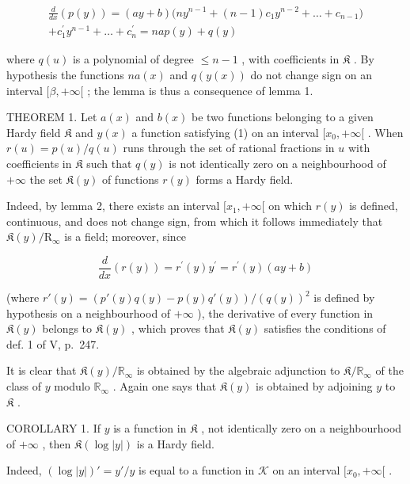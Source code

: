 \[
\begin{array}{c} \frac {d}{d x} (p (y)) = (a y + b) \bigl (n y ^ {n - 1} + (n - 1) c _ {1} y ^ {n - 2} + \dots + c _ {n - 1} \bigr) \\ + c _ {1} ^ {\prime} y ^ {n - 1} + \dots + c _ {n} ^ {\prime} = n a p (y) + q (y) \end{array}
\]

where \(q(u)\) is a polynomial of degree \(\leqslant n - 1\) , with coefficients in \(\mathfrak{K}\) . By hypothesis the functions \(na(x)\) and \(q(y(x))\) do not change sign on an interval \([\beta, +\infty[\) ; the lemma is thus a consequence of lemma 1.

THEOREM 1. Let \(a(x)\) and \(b(x)\) be two functions belonging to a given Hardy field \(\mathfrak{K}\) and \(y(x)\) a function satisfying (1) on an interval \([x_0, +\infty[\) . When \(r(u) = p(u) / q(u)\) runs through the set of rational fractions in \(u\) with coefficients in \(\mathfrak{K}\) such that \(q(y)\) is not identically zero on a neighbourhood of \(+\infty\) the set \(\mathfrak{K}(y)\) of functions \(r(y)\) forms a Hardy field.

Indeed, by lemma 2, there exists an interval \([x_1, +\infty[\) on which \(r(y)\) is defined, continuous, and does not change sign, from which it follows immediately that \(\mathfrak{K}(y)/\mathrm{R}_{\infty}\) is a field; moreover, since

\[
\frac {d}{d x} (r (y)) = r ^ {\prime} (y) y ^ {\prime} = r ^ {\prime} (y) (a y + b)
\]

(where \(r'(y) = \left(p'(y)q(y) - p(y)q'(y)\right)/\left(q(y)\right)^2\) is defined by hypothesis on a neighbourhood of \(+\infty\) ), the derivative of every function in \(\mathfrak{K}(y)\) belongs to \(\mathfrak{K}(y)\) , which proves that \(\mathfrak{K}(y)\) satisfies the conditions of def. 1 of V, p.~247.

It is clear that \(\mathfrak{K}(y) / \mathbb{R}_{\infty}\) is obtained by the algebraic adjunction to \(\mathfrak{K} / \mathbb{R}_{\infty}\) of the class of \(y\) modulo \(\mathbb{R}_{\infty}\) . Again one says that \(\mathfrak{K}(y)\) is obtained by adjoining \(y\) to \(\mathfrak{K}\) .

COROLLARY 1. If \(y\) is a function in \(\mathfrak{K}\) , not identically zero on a neighbourhood of \(+\infty\) , then \(\mathfrak{K}(\log |y|)\) is a Hardy field.

Indeed, \((\log |y|)' = y'/y\) is equal to a function in \(\mathcal{K}\) on an interval \([x_0, +\infty[\) .

